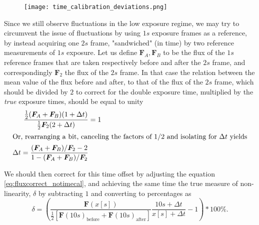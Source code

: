 \documentclass[../main.tex]{subfiles}
\begin{document}
	\begin{figure}
		\centering			\texttt{[image: time\_calibration\_deviations.png]}
		\caption{}
		\label{fig:timecaldev}
	\end{figure}
	Since we still observe fluctuations in the low exposure regime, we may try to circumvent the issue of fluctuations by using $1s$ exposure frames as a reference, by instead acquiring one $2s$ frame, "sandwiched" (in time) by two reference measurements of $1s$ exposure. Let us define $\bm F_A, \bm F_B$ to be the flux of the $1s$ reference frames that are taken respectively before and after the $2s$ frame, and correspondingly $\bm F_2$ the flux of the $2s$ frame. In that case the relation between the mean value of the flux before and after, to that of the flux of the $2s$ frame, which should be divided by $2$ to correct for the double exposure time, multiplied by the \textit{true} exposure times, should be equal to unity
	\begin{align}
		\frac{\frac12(\bm F_A + \bm F_B) (1+\Delta t)}{
			\frac12 \bm F_2 (2+\Delta t)} &= 1\\
		\intertext{Or, rearranging a bit, canceling the factors of $1/2$ and isolating for $\Delta t$ yields}
		\Delta t = 	\frac{(\bm F_A + \bm F_B) / \bm F_2 - 2}{1- (\bm F_A + \bm F_B)/ \bm F_2} \label{eq:timecalprec}
	\end{align}
	
	We should then correct for this time offset by adjusting the equation \ref{eq:fluxcorrect_notimecal}, and achieving the same time the true measure of non-linearity, $\delta$ by subtracting $1$ and converting to percentages as 
		\begin{equation}\label{eq:fluxcorrect_timecal}
		\delta = \left( \frac{\bm F(x [s])}{\frac12\left[\bm F(10s)_\text{before}+\bm F(10s)_\text{after}\right]}\frac{10s + \Delta t}{x [s] + \Delta t} - 1 \right) * 100\%.
		\end{equation}
		
\end{document}
